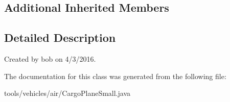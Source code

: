 \subsection*{Additional Inherited Members}


\subsection{Detailed Description}
Created by bob on 4/3/2016. 

The documentation for this class was generated from the following file\+:\begin{DoxyCompactItemize}
\item 
tools/vehicles/air/Cargo\+Plane\+Small.\+java\end{DoxyCompactItemize}

